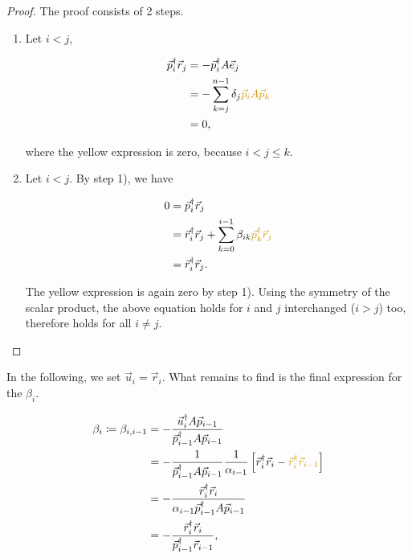 \documentclass{article}
\theoremstyle{plain} %
\theoremstyle{convention} %
\theoremstyle{remark} %
\numberwithin{equation}{section}
\begin{document}
\begin{proof}

The proof consists of 2 steps.

\begin{enumerate}[label={\arabic*)}]
    \item Let $i<j$,

    \begin{align*}
        \vec{p}_i^{\dagger} \vec{r}_j &= - \vec{p}_i^{\dagger} A \vec{e}_j \\
                                      &= - \sum_{k=j}^{n-1} \delta_j \textcolor{cyellow}{\vec{p}_i A \vec{p}_k} \\
                                      &= 0,
    \end{align*}

    where the \textcolor{cyellow}{yellow} expression is \textcolor{cyellow}{zero}, because $i<j\leq k$.

    \item Let $i<j$. By step 1), we have

    \begin{align*}
        0 &= \vec{p}_i^{\dagger} \vec{r}_j \\
          &= \vec{r}_i^{\dagger} \vec{r}_j + \sum_{k=0}^{i-1} \beta_{ik} \textcolor{cyellow}{\vec{p}_k^{\dagger} \vec{r}_j} \\
          &= \vec{r}_i^{\dagger} \vec{r}_j.
    \end{align*}

    The \textcolor{cyellow}{yellow} expression is again \textcolor{cyellow}{zero} by step 1). Using the symmetry of the scalar product, the above equation holds for $i$ and $j$ interchanged ($i>j$) too, therefore holds for all $i \neq j$.

\end{enumerate}

\end{proof}

In the following, we set $\vec{u}_i = \vec{r}_i$. What remains to find is the final expression for the $\beta_i$.

\begin{align*}
    \beta_i \coloneqq \beta_{i,i-1} &= - \frac{ \vec{u}_i^{\dagger} A \vec{p}_{i-1} }{ \vec{p}_{i-1}^{\dagger} A \vec{p}_{i-1} } \\
    &= - \frac{1}{\vec{p}_{i-1}^{\dagger} A \vec{p}_{i-1} } \frac{1}{\alpha_{i-1}} \left[ \vec{r}_i^{\dagger} \vec{r}_i - \textcolor{cyellow}{\vec{r}_i^{\dagger} \vec{r}_{i-1}} \right] \\
    &= - \frac{ \vec{r}_i^{\dagger} \vec{r}_i }{ \alpha_{i-1} \vec{p}_{i-1}^{\dagger} A \vec{p}_{i-1} } \\
    &= - \frac{ \vec{r}_i^{\dagger} \vec{r}_i }{ \vec{p}_{i-1}^{\dagger} \vec{r}_{i-1} },
\end{align*}
\end{document}

